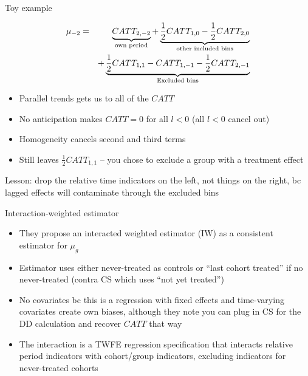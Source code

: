 \documentclass{beamer}
\begin{document}
\begin{frame}{Toy example}

\begin{eqnarray*}
\mu_{-2} &=& \underbrace{CATT_{2,-2}}_{\mathclap{\text{own period}}} + \underbrace{\frac{1}{2}CATT_{1,0} - \frac{1}{2} CATT_{2,0}}_{\mathclap{\text{other included bins}}} \\
&&+ \underbrace{ \frac{1}{2} CATT_{1,1} - CATT_{1,-1} - \frac{1}{2} CATT_{2,-1} }_{\mathclap{\text{Excluded bins}}}
\end{eqnarray*}

\begin{itemize}
\item Parallel trends gets us to all of the $CATT$
\item No anticipation makes $CATT=0$ for all $l<0$ (all $l<0$ cancel out)
\item Homogeneity cancels second and third terms
\item Still leaves $\frac{1}{2} CATT_{1,1}$ -- you chose  to exclude a group with a treatment effect
\end{itemize}Lesson: drop the relative time indicators on the left, not things on the right, bc lagged effects will contaminate through the excluded bins


\end{frame}

\begin{frame}{Interaction-weighted estimator}

\begin{itemize}
\item They propose an interacted weighted estimator (IW) as a consistent estimator for $\mu_g$
\item Estimator uses either never-treated as controls or ``last cohort treated'' if no never-treated (contra CS which uses ``not yet treated'')
\item No covariates bc this is a regression with fixed effects and time-varying covariates create own biases, although they note you can plug in CS for the DD calculation and recover $CATT$ that way
\item The interaction is a TWFE regression specification that interacts relative period indicators with cohort/group indicators, excluding indicators for never-treated cohorts
\end{itemize}

\end{frame}
\end{document}
